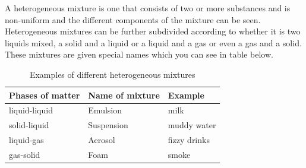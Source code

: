 \label{m38708*fhsst!!!underscore!!!id89}\Definition{\label{id2405839} { Heterogeneous mixture }} 
{ \label{m38708*meaningfhsst!!!underscore!!!id89}
        A heterogeneous mixture is one that consists of two or more substances and is non-uniform and the different components of the mixture can be seen.
         } 
Heterogeneous mixtures can be further subdivided according to whether it is two liquids mixed, a solid and a liquid or a liquid and a gas or even a gas and a solid. These mixtures are given special names which you can see in table below. \par
\begin{table}[h!]
 \begin{center}
  \begin{tabular}{|l|l|l|}\hline
   \textbf{Phases of matter} & \textbf{Name of mixture} & \textbf{Example} \\ \hline
   liquid-liquid & Emulsion & milk \\ \hline
   solid-liquid & Suspension & muddy water \\ \hline
   liquid-gas & Aerosol & fizzy drinks \\ \hline
   gas-solid & Foam & smoke \\ \hline
  \end{tabular}

 \end{center}
\caption{Examples of different heterogeneous mixtures}
\label{tab:mixtures}
\end{table}
\\
      \label{m38708*uid6}
